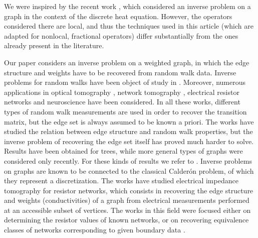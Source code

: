 \documentclass[a4paper,11pt,oneside]{amsart}
\begin{document}
We were inspired by the recent work \cite{BILL21}, which considered an inverse problem on a graph in the context of the discrete heat equation. However, the operators considered there are local, and thus the techniques used in this article (which are adapted for nonlocal, fractional operators) differ substantially from the ones already present in the literature.

Our paper considers an inverse problem on a weighted graph, in which the edge structure and weights have to be recovered from random walk data. Inverse problems
for random walks have been object of study in \cite{50, 51, 82, 85}. Moreover, numerous applications in optical
tomography \cite{60, 61, 62, 63, 84}, network tomography \cite{64, 92}, electrical resistor networks
\cite{42, 71, 80} and neuroscience \cite{8} have been considered. In all these works, different types of random walk measurements are used in order to recover the transition matrix, but the edge set is always assumed to be known a priori. The works \cite{9, 79, 81} have studied the relation between edge structure and random walk properties, but the inverse problem of recovering the edge set itself has proved much harder to solve. Results have been obtained for trees, while more general types of graphs were considered only recently. For these kinds of results we refer to \cite{3}. Inverse problems on graphs are known to be connected to the classical Calder\'on problem, of which they represent a discretization. The works \cite{21, 38, 44, 46, 77} have studied electrical impedance tomography for resistor networks, which consists in recovering the edge structure and weights (conductivities) of a graph from electrical measurements performed at an accessible subset of vertices. The works in this field were focused either on determining the resistor values of known networks, or on recovering equivalence classes of networks corresponding to given boundary data \cite{39, 40, 45}.
\end{document}
